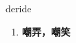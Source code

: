 
\begin{frame}
{\huge deride}
\begin{center}
\begin{enumerate}\Large
  \item \textbf{嘲弄，嘲笑}
\end{enumerate}
\end{center}
\end{frame}
